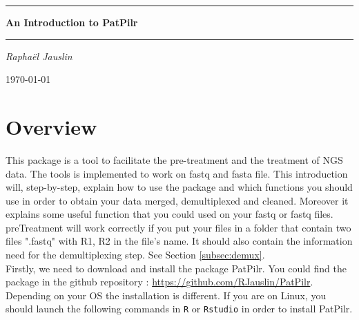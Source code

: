 \documentclass{article}\usepackage[]{graphicx}\usepackage[]{color}
\begin{document}

 \begin{titlepage}
 \hrule
 \vspace{0.5cm}
 {\huge\centering \bfseries An Introduction to PatPilr  \par}
 \vspace{0.5cm}
 \hrule
 \vspace{1.5cm}
 {\huge\bfseries \par}
 \vspace{2cm}
 {\Large\itshape Rapha\"el Jauslin\par}
 \vfill
 {\large \today\par}
 \end{titlepage}


\newpage

\tableofcontents
\newpage

\section{Overview}

This package is a tool to facilitate the pre-treatment and the treatment of NGS data. The tools is implemented to work on fastq and fasta file. This introduction will, step-by-step, explain how to use the package and which functions you should use in order to obtain your data merged, demultiplexed and cleaned. Moreover it explains some useful function that you could used on your fastq or fastq files.\\

preTreatment will work correctly if you put your files in a folder that contain two files ".fastq" with R1, R2 in the file's name. It should also contain the information need for the demultiplexing step. See Section \ref{subsec:demux}.\\

Firstly, we need to download and install the package PatPilr. You could find the package in the github repository : \url{https://github.com/RJauslin/PatPilr}. Depending on your OS the installation is different.  If you are on Linux, you should launch the following commands in \texttt{R} or \texttt{Rstudio} in order to install PatPilr.
\end{document}
